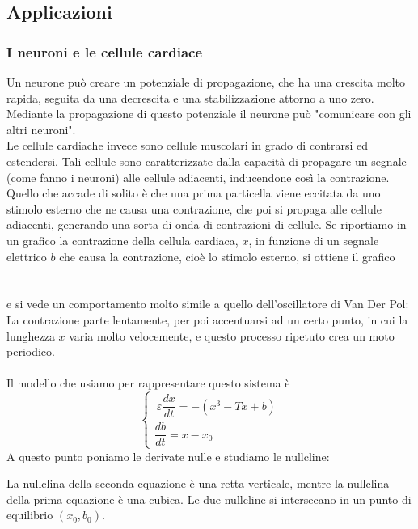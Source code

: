 \documentclass[12pt]{article}
\begin{document}
\subsection{Applicazioni}
\subsubsection{I neuroni e le cellule cardiace}
Un neurone può creare un potenziale di propagazione, che ha una crescita molto rapida, seguita da una decrescita e una stabilizzazione attorno a uno zero. Mediante la propagazione di questo potenziale il neurone può "comunicare con gli altri neuroni". \\
Le cellule cardiache invece sono cellule muscolari in grado di contrarsi ed estendersi. Tali cellule sono caratterizzate dalla capacità di propagare un segnale (come fanno i neuroni) alle cellule adiacenti, inducendone così la contrazione. Quello che accade di solito è che una prima particella viene eccitata da uno stimolo esterno che ne causa una contrazione, che poi si propaga alle cellule adiacenti, generando una sorta di onda di contrazioni di cellule. Se riportiamo in un grafico la contrazione della cellula cardiaca, $x$, in funzione di un segnale elettrico $b$ che causa la contrazione, cioè lo stimolo esterno, si ottiene il grafico \\ \\ \\
e si vede un comportamento molto simile a quello dell'oscillatore di Van Der Pol:
La contrazione parte lentamente, per poi accentuarsi ad un certo punto, in cui la lunghezza $x$ varia molto velocemente, e questo processo ripetuto crea un moto periodico. \\ \\
Il modello che usiamo per rappresentare questo sistema è
\begin{equation}
	\begin{cases}
		\ \varepsilon \dfrac{dx}{dt} = -(x^3 - Tx + b) \\
		\dfrac{db}{dt} = x - x_0
	\end{cases}
\end{equation}
A questo punto poniamo le derivate nulle e studiamo le nullcline: 
\begin{figure}[H]
	\centering
	
\end{figure}
La nullclina della seconda equazione è una retta verticale, mentre la nullclina della prima equazione è una cubica. Le due nullcline si intersecano in un punto di equilibrio $(x_0,b_0)$. \\ 
\end{document}
